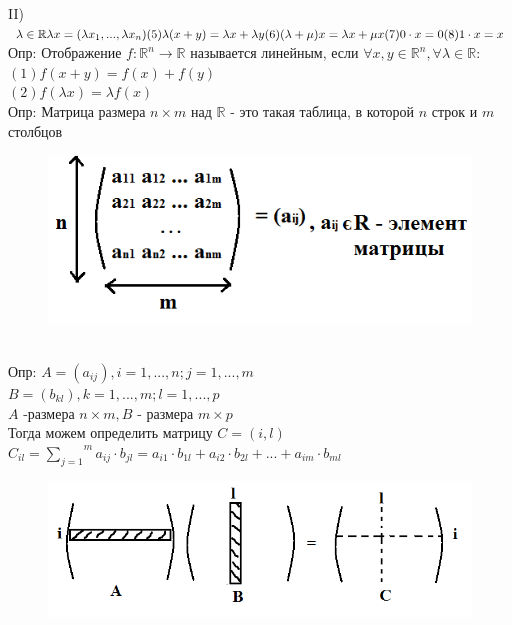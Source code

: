 \documentclass[12pt, oneside]{book}
\theoremstyle{definition}
\begin{document}
\begin{enumerate}
II) $\lambda \in \mathbb{R}\\
\lambda x = (\lambda x_1, ..., \lambda x_n)\\
(5)\lambda (x+y) = \lambda x + \lambda y\\
(6) (\lambda + \mu)x = \lambda x + \mu x\\
(7) 0 \cdot x = 0\\
(8) 1 \cdot x = x$\\
Опр: Отображение $f: \mathbb{R}^n \longrightarrow \mathbb{R}$ называется линейным, если $\forall x,y \in \mathbb{R}^n, \forall \lambda \in \mathbb{R}$:\\
$(1)f(x+y)=f(x)+f(y)$\\
$(2)f(\lambda x) = \lambda f(x)$\\
Опр: Матрица размера $n \times m$ над $\mathbb{R}$ - это такая таблица, в которой $n$ строк и $m$ столбцов\\
\begin{figure}[h!]
\centering
\includegraphics[scale=0.6]{2-1.PNG}
\end{figure}\\
Опр:  $A = (a_{ij}), i = 1,...,n; j = 1,..., m$\\
$B = (b_{kl}), k = 1,...,m; l = 1,..., p$\\
$A$ -размера $n\times m, B$ - размера $m\times p$\\
Тогда можем определить матрицу $C = (i, l)$\\
$C_{il} = \overset{m}{\underset{j=1}{\sum}} a_{ij} \cdot b_{jl} = a_{i1}\cdot b_{1l} + a_{i2}\cdot b_{2l} + ... + a_{im}\cdot b_{ml}$\\
\begin{figure}[h!]
\centering
\includegraphics[scale=0.6]{2-2.PNG}

\end{figure}
\end{enumerate}
\end{document}
